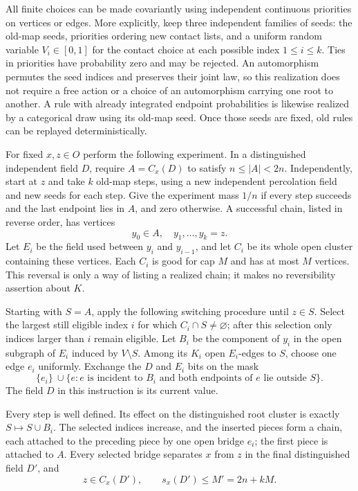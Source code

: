 All finite choices can be made covariantly using independent continuous
priorities on vertices or edges.  More explicitly, keep three independent
families of seeds: the old-map seeds, priorities ordering new contact
lists, and a uniform random variable $V_i\in[0,1]$ for the contact choice
at each possible index $1\le i\le k$.  Ties in priorities have probability
zero and may be rejected.  An automorphism permutes the seed indices and
preserves their joint law, so this realization does not require a free
action or a choice of an automorphism carrying one root to another.
A rule with already integrated endpoint probabilities is likewise
realized by a categorical draw using its old-map seed.  Once those seeds
are fixed, old rules can be replayed deterministically.

For fixed $x,z\in O$ perform the following experiment.  In a distinguished
independent field $D$, require
$A=C_x(D)$ to satisfy $n\le|A|<2n$.  Independently, start at $z$ and take
$k$ old-map steps, using a new independent percolation field and new seeds
for each step.  Give the experiment mass $1/n$ if every step succeeds and
the last endpoint lies in $A$, and zero otherwise.  A successful chain,
listed in reverse order, has vertices
\[
 y_0\in A,\quad y_1,\ldots,y_k=z.
\]
Let $E_i$ be the field used between $y_i$ and $y_{i-1}$, and let $C_i$ be
its whole open cluster containing these vertices.  Each $C_i$ is good for
cap $M$ and has at most $M$ vertices.  This reversal is only a way of
listing a realized chain; it makes no reversibility assertion about $K$.

Starting with $S=A$, apply the following switching procedure until
$z\in S$.  Select the largest still eligible index $i$ for which
$C_i\cap S\ne\varnothing$; after this selection only indices larger than
$i$ remain eligible.  Let $B_i$ be the component of $y_i$ in the open
subgraph of $E_i$ induced by $V\setminus S$.  Among its $K_i$ open
$E_i$-edges to $S$, choose one edge $e_i$ uniformly.  Exchange the $D$ and
$E_i$ bits on the mask
\[
 \{e_i\}\ \cup {}
 \{e:e\text{ is incident to }B_i
             \text{ and both endpoints of }e\text{ lie outside }S\}.
\]
The field $D$ in this instruction is its current value.

\begin{lemma}\label{amp:splicing}
Every step is well defined.  Its effect on the distinguished root cluster
is exactly $S\mapsto S\cup B_i$.  The selected indices increase, and the
inserted pieces form a chain, each attached to the preceding piece by
one open bridge $e_i$; the first piece is attached to $A$.
Every selected bridge separates $x$ from $z$ in the final distinguished
field $D'$, and
\begin{equation}\label{eq:s11}
 z\in C_x(D'),\qquad s_x(D')\le M'=2n+kM.
\end{equation}
\end{lemma}

